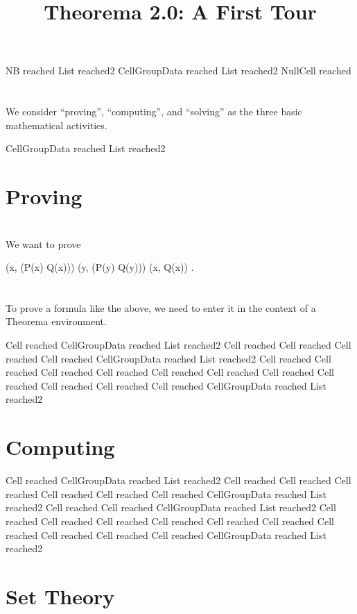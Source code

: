 \documentclass{article}
\newcommand{\light}[1]{{\color{lightgray}#1}}
\begin{document}
% 

\title{Theorema 2.0: A First Tour}
\author{}
\date{}
\maketitle

\light{NB reached} \light{List reached2} \light{CellGroupData reached} \light{List reached2} Null\light{Cell reached} \begingroup \section*{} We consider “proving”, “computing”, and “solving” as the three basic mathematical activities.\endgroup 

\light{CellGroupData reached} \light{List reached2} \section{Proving}

\begingroup \section*{} We want to prove\endgroup 

\begin{center}(\forall x, (P(x) \lor Q(x))) \land (\forall y, (P(y) \Rightarrow Q(y))) \Leftrightarrow (\forall x, Q(x)) .\end{center}
\begingroup \section*{} To prove a formula like the above, we need to enter it in the context of a Theorema environment.\endgroup 

\light{Cell reached} \light{CellGroupData reached} \light{List reached2} \light{Cell reached} \light{Cell reached} \light{Cell reached} \light{Cell reached} \light{CellGroupData reached} \light{List reached2} \light{Cell reached} \light{Cell reached} \light{Cell reached} \light{Cell reached} \light{Cell reached} \light{Cell reached} \light{Cell reached} \light{Cell reached} \light{Cell reached} \light{Cell reached} \light{Cell reached} \light{CellGroupData reached} \light{List reached2} \section{Computing}

\light{Cell reached} \light{CellGroupData reached} \light{List reached2} \light{Cell reached} \light{Cell reached} \light{Cell reached} \light{Cell reached} \light{Cell reached} \light{Cell reached} \light{CellGroupData reached} \light{List reached2} \light{Cell reached} \light{Cell reached} \light{CellGroupData reached} \light{List reached2} \light{Cell reached} \light{Cell reached} \light{Cell reached} \light{Cell reached} \light{Cell reached} \light{Cell reached} \light{Cell reached} \light{Cell reached} \light{Cell reached} \light{Cell reached} \light{CellGroupData reached} \light{List reached2} \section{Set Theory}
\end{document}
